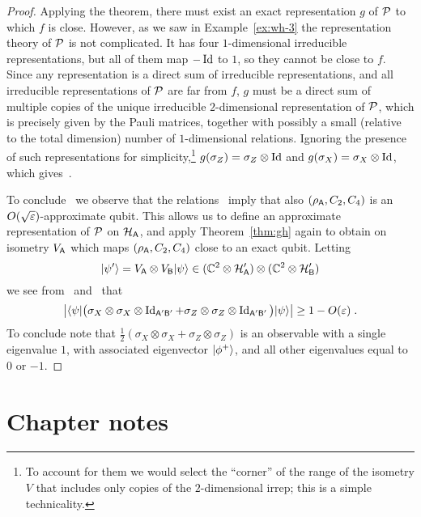 \begin{proof}
Applying the theorem, there must exist an exact representation $g$ of $\mathcal{P}$ to which $f$ is close. However, as we saw in Example~\ref{ex:wh-3} the representation theory of $\mathcal{P}$ is not complicated. It has four $1$-dimensional irreducible representations, but all of them map $-\mathop{\rm Id}\nolimits$ to $1$, so they cannot be close to $f$. Since any representation is a direct sum of irreducible representations, and all irreducible representations of $\mathcal{P}$ are far from $f$, $g$ must be a direct sum of multiple copies of the unique irreducible $2$-dimensional representation of $\mathcal{P}$, which is precisely given by the Pauli matrices, together with possibly a small (relative to the total dimension) number of $1$-dimensional relations. Ignoring the presence of such representations for simplicity,\footnote{To account for them we would select the ``corner'' of the range of the isometry $V$ that includes only copies of the $2$-dimensional irrep; this is a simple technicality.} $g(\sigma_Z) = \sigma_Z \otimes \mathop{\rm Id}\nolimits$ and $g(\sigma_X) = \sigma_X \otimes \mathop{\rm Id}\nolimits$, which gives~. 

To conclude~ we observe that the relations~ imply that also $(\rho_{\textsf{A}},C_2,C_4)$ is an $O(\sqrt{\varepsilon})$-approximate qubit. This allows us to define an approximate representation of $\mathcal{P}$ on $\mathcal{H}_{\textsf{A}}$, and apply Theorem~\ref{thm:gh} again to obtain on isometry $V_{\textsf{A}}$ which maps $(\rho_{\textsf{A}},C_2,C_4)$ close to an exact qubit. Letting 
\[ |\psi'\rangle = V_{\textsf{A}} \otimes V_{\textsf{B}} |\psi\rangle \in (\mathbb{C}^2 \otimes \mathcal{H}_{\textsf{A}}')\otimes (\mathbb{C}^2 \otimes \mathcal{H}_{\textsf{B}}') \]
we see from~ and~ that 
\[\big| \langle\psi| \big(\sigma_X \otimes \sigma_X \otimes \mathop{\rm Id}\nolimits_{{\textsf{A}}'{\textsf{B}}'} + \sigma_Z \otimes \sigma_Z \otimes \mathop{\rm Id}\nolimits_{{\textsf{A}}'{\textsf{B}}'} \big) |\psi\rangle\big| \geq 1-O({\varepsilon})\;.\]
To conclude note that $\frac{1}{2}(\sigma_X \otimes \sigma_X + \sigma_Z \otimes \sigma_Z )$ is an observable with a single eigenvalue $1$, with associated eigenvector $|\phi^+\rangle$, and all other eigenvalues equal to $0$ or $-1$. 
\end{proof}


\section{Chapter notes}
\label{section-rigidity-notes}








